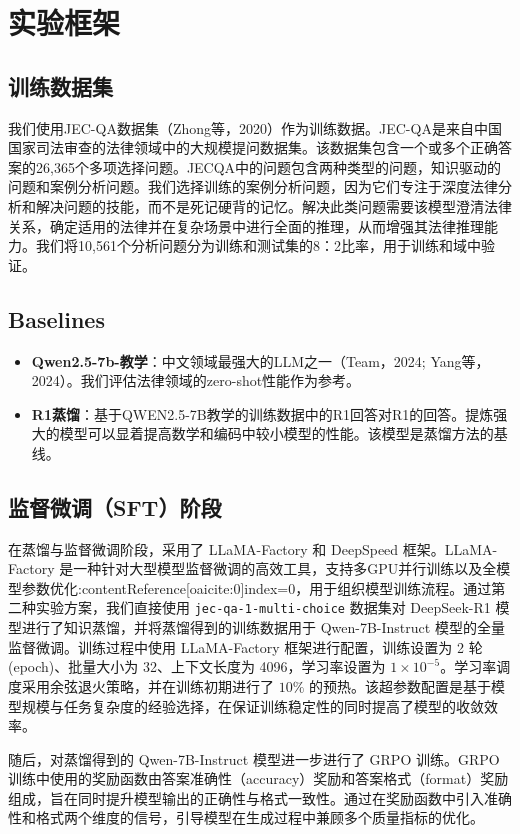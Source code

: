 \documentclass{pkuthesis}
\begin{document}
\section{实验框架}
\subsection{训练数据集}
我们使用JEC-QA数据集（Zhong等，2020）作为训练数据。JEC-QA是来自中国国家司法审查的法律领域中的大规模提问数据集。该数据集包含一个或多个正确答案的26,365个多项选择问题。JECQA中的问题包含两种类型的问题，知识驱动的问题和案例分析问题。我们选择训练的案例分析问题，因为它们专注于深度法律分析和解决问题的技能，而不是死记硬背的记忆。解决此类问题需要该模型澄清法律关系，确定适用的法律并在复杂场景中进行全面的推理，从而增强其法律推理能力。我们将10,561个分析问题分为训练和测试集的8：2比率，用于训练和域中验证。

\subsection{Baselines}
\begin{itemize}
    \item \textbf{Qwen2.5-7b-教学}：中文领域最强大的LLM之一（Team，2024; Yang等，2024）。我们评估法律领域的zero-shot性能作为参考。
    \item \textbf{R1蒸馏}：基于QWEN2.5-7B教学的训练数据中的R1回答对R1的回答。提炼强大的模型可以显着提高数学和编码中较小模型的性能\cite{guo2025deepseek}。该模型是蒸馏方法的基线。
\end{itemize}

\subsection{监督微调（SFT）阶段}

在蒸馏与监督微调阶段，采用了 LLaMA-Factory 和 DeepSpeed 框架。LLaMA-Factory 是一种针对大型模型监督微调的高效工具，支持多GPU并行训练以及全模型参数优化:contentReference[oaicite:0]{index=0}，用于组织模型训练流程。通过第二种实验方案，我们直接使用 \texttt{jec-qa-1-multi-choice} 数据集对 DeepSeek-R1 模型进行了知识蒸馏，并将蒸馏得到的训练数据用于 Qwen-7B-Instruct 模型的全量监督微调。训练过程中使用 LLaMA-Factory 框架进行配置，训练设置为 2 轮(epoch)、批量大小为 32、上下文长度为 4096，学习率设置为 $1\times 10^{-5}$。学习率调度采用余弦退火策略，并在训练初期进行了 $10\%$ 的预热。该超参数配置是基于模型规模与任务复杂度的经验选择，在保证训练稳定性的同时提高了模型的收敛效率。

随后，对蒸馏得到的 Qwen-7B-Instruct 模型进一步进行了 GRPO 训练。GRPO 训练中使用的奖励函数由答案准确性（accuracy）奖励和答案格式（format）奖励组成，旨在同时提升模型输出的正确性与格式一致性。通过在奖励函数中引入准确性和格式两个维度的信号，引导模型在生成过程中兼顾多个质量指标的优化。
\end{document}
